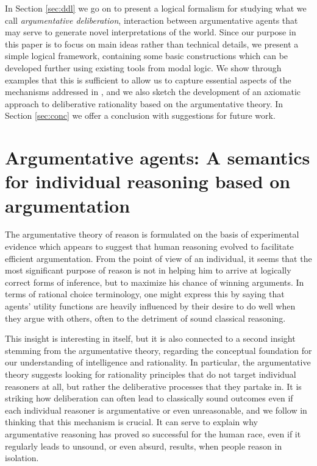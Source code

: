 \documentclass[greybox]{svmult}
\begin{document}
In Section \ref{sec:ddl} we go on to present a logical formalism for studying what we call \emph{argumentative deliberation}, interaction between argumentative agents that may serve to generate novel interpretations of the world. Since our purpose in this paper is to focus on main ideas rather than technical details, we present a simple logical framework, containing some basic constructions which can be developed further using existing tools from modal logic. We show through examples that this is sufficient to allow us to capture essential aspects of the mechanisms addressed in \cite{mercier}, and we also sketch the development of an axiomatic approach to deliberative rationality based on the argumentative theory. In Section \ref{sec:conc} we offer a conclusion with suggestions for future work.

\section{Argumentative agents: A semantics for individual reasoning based on argumentation}\label{sec:arg}

The argumentative theory of reason is formulated on the basis of experimental evidence which appears to suggest that human reasoning evolved to facilitate efficient argumentation. From the point of view of an individual, it seems that the most significant purpose of reason is not in helping him to arrive at logically correct forms of inference, but to maximize his chance of winning arguments. In terms of rational choice terminology, one might express this by saying that agents' utility functions are heavily influenced by their desire to do well when they argue with others, often to the detriment of sound classical reasoning.

This insight is interesting in itself, but it is also connected to a second insight stemming from the argumentative theory, regarding the conceptual foundation for our understanding of intelligence and rationality. 
In particular, the argumentative theory suggests looking for rationality principles that do not target individual reasoners at all, but rather the deliberative processes that they partake in. It is striking how deliberation can often lead to classically sound outcomes even if each individual reasoner is argumentative or even unreasonable, and we follow \cite{mercier} in thinking that this mechanism is crucial. It can serve to explain why argumentative reasoning has proved so successful for the human race, even if it regularly leads to unsound, or even absurd, results, when people reason in isolation. 
\end{document}
